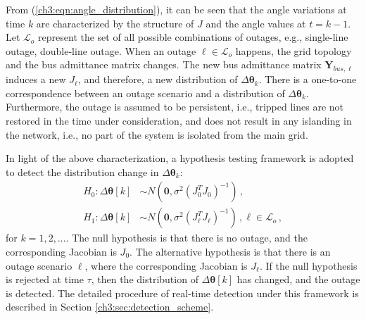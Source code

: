 From (\ref{ch3:eqn:angle_distribution}), it can be seen that the angle variations at time $k$ are characterized by the structure of ${J}$ and the angle values at $t = k-1$. Let $\mathcal{L}_o$ represent the set of all possible combinations of outages, e.g., single-line outage, double-line outage. When an outage $\ell \in \mathcal{L}_o$ happens, the grid topology and the bus admittance matrix changes. The new bus admittance matrix $\boldsymbol{Y}_{bus, \ell}$ induces a new ${J}_{\ell}$, and therefore, a new distribution of $\Delta\boldsymbol{\theta}_k$. There is a one-to-one correspondence between an outage scenario and a distribution of $\Delta\boldsymbol{\theta}_k$. Furthermore, the outage is assumed to be persistent, i.e., tripped lines are not restored in the time under consideration, and does not result in any islanding in the network, i.e., no part of the system is isolated from the main grid. 

In light of the above characterization, a hypothesis testing framework is adopted to detect the distribution change in $\Delta\boldsymbol{\theta}_k$:
\begin{subequations}
\label{ch3:eqn:pre_post_distribution}
\begin{align}
     H_0: \Delta\boldsymbol{\theta}[k] &\sim {N}(\boldsymbol{0}, \sigma^2 ({J}_0^T {J}_0)^{-1}) \,,  \label{ch3:eqn:pre_distribution}\\
     H_1: \Delta\boldsymbol{\theta}[k] &\sim {N}(\boldsymbol{0}, \sigma^2 ({J}_{\ell}^T {J}_{\ell})^{-1}) \,, \ell \in \mathcal{L}_o \,, \label{ch3:eqn:post_distribution}
\end{align}
 \end{subequations}
for $k = 1, 2, \dots$. The null hypothesis is that there is no outage, and the corresponding Jacobian is ${J}_0$. The alternative hypothesis is that there is an outage scenario $\ell$, where the corresponding Jacobian is ${J}_{\ell}$. If the null hypothesis is rejected at time $\tau$, then the distribution of $\Delta\boldsymbol{\theta}[k]$ has changed, and the outage is detected. The detailed procedure of real-time detection under this framework is described in Section \ref{ch3:sec:detection_scheme}.

